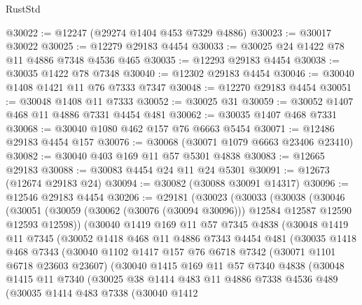 \begin{lexlean}{RustStd}
\begin{coremodule}
@30022 := @12247 (@29274 @1404 @453 @7329 @4886)
@30023 := @30017 @30022
@30025 := @12279 @29183 @4454
@30033 := @30025 @24 @1422 @78 @11 @4886 @7348 @4536 @465
@30035 := @12293 @29183 @4454
@30038 := @30035 @1422 @78 @7348
@30040 := @12302 @29183 @4454
@30046 := @30040 @1408 @1421 @11 @76 @7333 @7347
@30048 := @12270 @29183 @4454
@30051 := @30048 @1408 @11 @7333
@30052 := @30025 @31
@30059 := @30052 @1407 @468 @11 @4886 @7331 @4454 @481
@30062 := @30035 @1407 @468 @7331
@30068 := @30040 @1080 @462 @157 @76 @6663 @5454
@30071 := @12486 @29183 @4454 @157
@30076 := @30068 (@30071 @1079 @6663 @23406 @23410)
@30082 := @30040 @403 @169 @11 @57 @5301 @4838
@30083 := @12665 @29183
@30088 := @30083 @4454 @24 @11 @24 @5301
@30091 := @12673 (@12674 @29183 @24)
@30094 := @30082 (@30088 @30091 @14317)
@30096 := @12546 @29183 @4454
@30206 := @29181
    (@30023
      (@30033
        (@30038
          (@30046
            (@30051 (@30059 (@30062 (@30076 (@30094 @30096))) @12584 @12587 @12590 @12593 @12598))
            (@30040
              @1419
              @169
              @11
              @57
              @7345
              @4838
              (@30048
                @1419
                @11
                @7345
                (@30052
                  @1418
                  @468
                  @11
                  @4886
                  @7343
                  @4454
                  @481
                  (@30035
                    @1418
                    @468
                    @7343
                    (@30040
                      @1102
                      @1417
                      @157
                      @76
                      @6718
                      @7342
                      (@30071 @1101 @6718 @23603 @23607)
                      (@30040
                        @1415
                        @169
                        @11
                        @57
                        @7340
                        @4838
                        (@30048
                          @1415
                          @11
                          @7340
                          (@30025
                            @38
                            @1414
                            @483
                            @11
                            @4886
                            @7338
                            @4536
                            @489
                            (@30035
                              @1414
                              @483
                              @7338
                              (@30040
                                @1412

\end{coremodule}
\end{lexlean}
